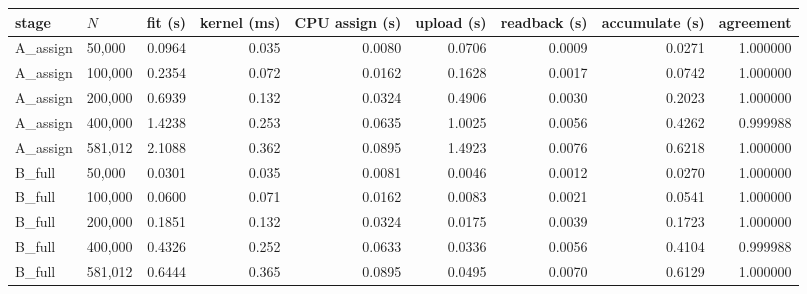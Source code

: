 \begin{tabular}{llrrrrrrr}
\toprule
stage & $N$ & fit (s) & kernel (ms) & CPU assign (s) & upload (s) & readback (s) & accumulate (s) & agreement\\
\midrule
A\_assign & 50,000 & 0.0964 & 0.035 & 0.0080 & 0.0706 & 0.0009 & 0.0271 & 1.000000\\
A\_assign & 100,000 & 0.2354 & 0.072 & 0.0162 & 0.1628 & 0.0017 & 0.0742 & 1.000000\\
A\_assign & 200,000 & 0.6939 & 0.132 & 0.0324 & 0.4906 & 0.0030 & 0.2023 & 1.000000\\
A\_assign & 400,000 & 1.4238 & 0.253 & 0.0635 & 1.0025 & 0.0056 & 0.4262 & 0.999988\\
A\_assign & 581,012 & 2.1088 & 0.362 & 0.0895 & 1.4923 & 0.0076 & 0.6218 & 1.000000\\
B\_full & 50,000 & 0.0301 & 0.035 & 0.0081 & 0.0046 & 0.0012 & 0.0270 & 1.000000\\
B\_full & 100,000 & 0.0600 & 0.071 & 0.0162 & 0.0083 & 0.0021 & 0.0541 & 1.000000\\
B\_full & 200,000 & 0.1851 & 0.132 & 0.0324 & 0.0175 & 0.0039 & 0.1723 & 1.000000\\
B\_full & 400,000 & 0.4326 & 0.252 & 0.0633 & 0.0336 & 0.0056 & 0.4104 & 0.999988\\
B\_full & 581,012 & 0.6444 & 0.365 & 0.0895 & 0.0495 & 0.0070 & 0.6129 & 1.000000\\
\bottomrule
\end{tabular}
